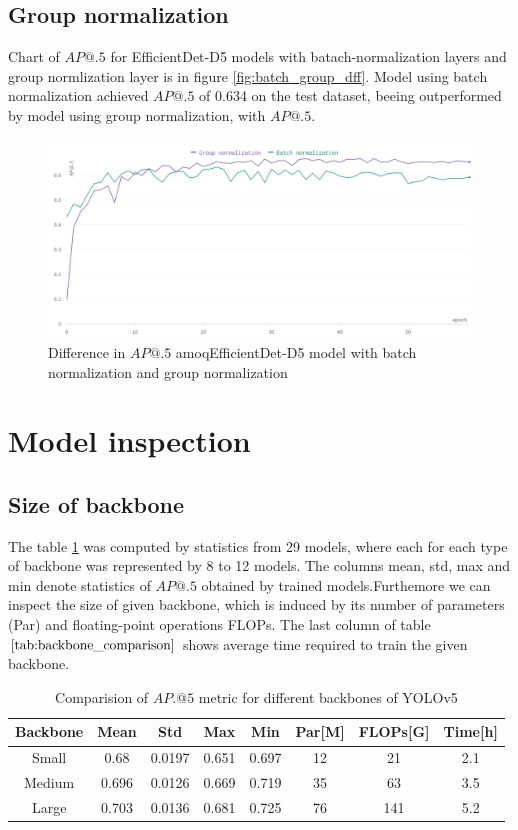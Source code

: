 \subsection{Group normalization}
Chart of $AP@.5$ for EfficientDet-D5 models with batach-normalization layers and group normlization layer is in figure \ref{fig:batch_group_dff}. Model using batch normalization achieved $AP@.5$ of 0.634 on the test dataset, beeing outperformed by model using group normalization, with $AP@.5$.
\begin{figure}[H]
    \centering
    \includegraphics[width=\textwidth]{images/batch_norm_group_norm.png}
    \caption{Difference in $AP@.5$ amoqEfficientDet-D5 model with batch normalization and group normalization}
    \label{fig:batch_group_diff}
\end{figure}

\section{Model inspection}
\label{sec:model_inspection_results}
\subsection{Size of backbone}
The table \ref{tab:backbone_comparison} was computed by statistics from 29 models, where each for each type of backbone was represented by 8 to 12 models. The columns mean, std, max and min denote statistics of $AP@.5$ obtained by trained models.Furthemore we can inspect the size of given backbone, which is induced by its number of parameters (Par) and floating-point operations FLOPs. The last column of table $\ref{tab:backbone_comparison}$ shows average time required to train the given backbone.
\begin{table}[H]
    \begin{tabular}{|c|c|c|c|c|c|c|c|}
        \hline
        Backbone & Mean  & Std    & Max   & Min   & Par[M] & FLOPs[G] & Time[h] \\ \hline
        Small    & 0.68  & 0.0197 & 0.651 & 0.697 & 12     & 21       & 2.1     \\ \hline
        Medium   & 0.696 & 0.0126 & 0.669 & 0.719 & 35     & 63       & 3.5     \\ \hline
        Large    & 0.703 & 0.0136 & 0.681 & 0.725 & 76     & 141      & 5.2     \\ \hline
    \end{tabular}
    \caption{Comparision of $AP.@5$ metric for different backbones of YOLOv5}
    \label{tab:backbone_comparison}
\end{table}

